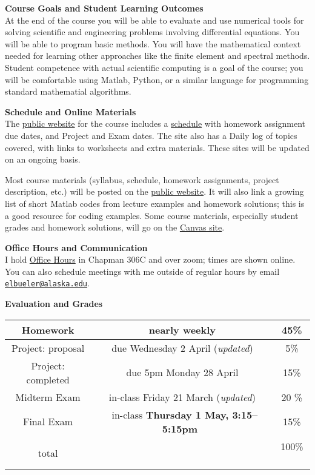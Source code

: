 \documentclass[12pt]{article}
\renewcommand{\emph}[1]{\textsf{\textbf{#1}}}
\newcommand{\localhead}[1]{\par\smallskip\textbf{#1} \smallskip\nobreak\\}%
\def\heading#1{\localhead{\large\emph{#1}}}
\begin{document}
\clearpage\newpage
\phantom{x}\vspace{-3mm}

\heading{Course Goals and Student Learning Outcomes}
At the end of the course you will be able to evaluate and use numerical tools for solving scientific and engineering problems involving differential equations.  You will be able to program basic methods.  You will have the mathematical context needed for learning other approaches like the finite element and spectral methods.  Student competence with actual scientific computing is a goal of the course; you will be comfortable using Matlab, Python, or a similar language for programming standard mathematial algorithms.


\heading{Schedule and Online Materials}
The \href{https://bueler.github.io/nade/}{public website} for the course includes a \href{https://bueler.github.io/nade/assets/general/S25/schedule.pdf}{schedule} with homework assignment due dates, and Project and Exam dates.  The site also has a Daily log of topics covered, with links to worksheets and extra materials.  These sites will be updated on an ongoing basis.

Most course materials (syllabus, schedule, homework assignments, project description, etc.) will be posted on the \href{https://bueler.github.io/nade/}{public website}.  It will also link a growing list of short Matlab codes from lecture examples and homework solutions; this is a good resource for coding examples.  Some course materials, especially student grades and homework solutions, will go on the \href{https://canvas.alaska.edu/courses/24194}{Canvas site}.


\heading{Office Hours and Communication}
I hold \href{http://bueler.github.io/OffHrs.htm}{Office Hours} in Chapman 306C and over zoom; times are shown online.  You can also schedule meetings with me outside of regular hours by email \href{mailto:elbueler@alaska.edu}{\texttt{elbueler@alaska.edu}}.

\medskip
\heading{Evaluation and Grades}
\vskip -10pt

\begin{tabular}{|c|c|c|}
\hline
Homework & nearly weekly & 45\% \\
\hline
Project: proposal & {\color{red} due Wednesday 2 April (\textsl{updated})} & 5\%  \\
\hline
Project: completed & due 5pm Monday 28 April & 15\%  \\
\hline
Midterm Exam & {\color{red} in-class Friday 21 March (\textsl{updated})} & 20 \%  \\
\hline
Final Exam & \, in-class \emph{Thursday 1 May, 3:15--5:15pm} \, & 15\% \\
\hline
total & & 100\% \, \\
\hline
\end{tabular}
\end{document}
